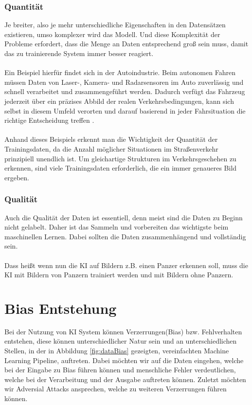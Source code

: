 \documentclass[12pt,oneside,a4paper,parskip]{scrbook}
\begin{document}
\subsection{Quantität}
\label{section:DataQuantity}
Je breiter, also je mehr unterschiedliche Eigenschaften in den Datensätzen existieren, umso komplexer wird das Modell. Und diese Komplexität der Probleme erfordert, dass die Menge an Daten entsprechend groß sein muss, damit das zu trainierende System immer besser reagiert.
\\\\
Ein Beispiel hierfür findet sich in der Autoindustrie. Beim autonomen Fahren müssen Daten von Laser-, Kamera- und Radarsensoren im Auto zuverlässig und schnell verarbeitet und zusammengeführt werden. Dadurch verfügt das Fahrzeug jederzeit über ein präzises Abbild der realen Verkehrsbedingungen, kann sich selbst in diesem Umfeld verorten und darauf basierend in jeder Fahrsituation die richtige Entscheidung treffen \cite{autonomesFahren}.
\\\\
Anhand dieses Beispiels erkennt man die Wichtigkeit der Quantität der Trainingsdaten, da die Anzahl möglicher Situationen im Straßenverkehr prinzipiell unendlich ist. Um gleichartige Strukturen im Verkehrsgeschehen zu erkennen, sind viele Trainingsdaten erforderlich, die ein immer genaueres Bild ergeben.

\subsection{Qualität}
\label{section:DataQuality}
Auch die Qualität der Daten ist essentiell, denn meist sind die Daten zu Beginn nicht gelabelt. Daher ist das Sammeln und vorbereiten das wichtigste beim maschinellen Lernen. Dabei sollten die Daten zusammenhängend und vollständig sein.
\\\\
Dass heißt wenn nun die KI auf Bildern z.B. einen Panzer erkennen soll\cite{panzer}, muss die KI mit Bildern von Panzern trainiert werden und mit Bildern ohne Panzern.


\chapter{Bias Entstehung}
Bei der Nutzung von KI System können Verzerrungen(Bias) bzw. Fehlverhalten entstehen, diese können unterschiedlicher Natur sein und an unterschiedlichen Stellen, in der in Abbildung \ref{fig:dataBias} gezeigten, vereinfachten Machine Learning Pipeline, auftreten. Dabei möchten wir auf die Daten eingehen, welche bei der Eingabe zu Bias führen können und menschliche Fehler verdeutlichen, welche bei der Verarbeitung und der Ausgabe auftreten können. Zuletzt möchten wir Adversial Attacks ansprechen, welche zu weiteren Verzerrungen führen können.
\end{document}
